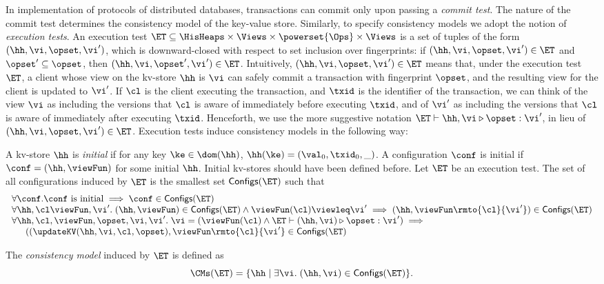 In implementation of protocols of distributed databases, transactions can 
commit only upon passing a \emph{commit test}. 
The nature of the commit test determines the consistency model of 
the key-value store.
Similarly, to specify consistency models we adopt the notion of 
\emph{execution tests}. An execution test 
$\ET \subseteq \HisHeaps \times \Views \times \powerset{\Ops} \times \Views$ 
is a set of tuples of the form $(\hh, \vi, \opset, \vi')$, 
which is downward-closed with respect to set inclusion over fingerprints: 
if $(\hh, \vi, \opset, \vi') \in \ET$ and $\opset' \subseteq \opset$, then 
$(\hh, \vi, \opset', \vi') \in \ET$.
Intuitively, 
$(\hh, \vi, \opset, \vi') \in \ET$ means that, under the execution test 
$\ET$, a client whose view on the kv-store $\hh$ is $\vi$ can safely 
commit a transaction with fingerprint $\opset$, and the resulting 
view for the client is updated to $\vi'$. If $\cl$ is the client executing 
the transaction, and $\txid$ is the identifier of the transaction, we can think of the view 
$\vi$ as including the versions that $\cl$ is aware of immediately before 
executing $\txid$, and of $\vi'$ as including the versions that $\cl$ is 
aware of immediately after executing $\txid$.
Henceforth, we use the more 
suggestive notation $\ET \vdash \hh, \vi \triangleright \opset : \vi'$, 
in lieu of $(\hh, \vi, \opset, \vi') \in \ET$.
Execution tests induce consistency models in the following way: 
\begin{definition}
\label{def:cm}
A kv-store $\hh$ is \emph{initial} if for any key $\ke \in \dom(\hh)$, 
$\hh(\ke) = (\val_0, \txid_0, \_)$. A configuration $\conf$ is 
initial  if $\conf = (\hh, \viewFun)$ for some initial $\hh$.
\ac{Initial kv-stores should have been defined before.}
Let $\ET$ be an execution test. The set of all configurations 
induced by $\ET$ is the smallest set $\mathsf{Configs}(\ET)$ 
such that 
\[
\begin{array}{l}
\forall \conf. \conf \text{ is initial} \implies \conf \in \mathsf{Configs}(\ET)\\
\forall \hh, \cl \viewFun,\vi'.\; (\hh, \viewFun) \in \mathsf{Configs}(\ET) \wedge \viewFun(\cl) \viewleq \vi' \implies (\hh, \viewFun\rmto{\cl}{\vi'}) \in \mathsf{Configs}(\ET)\\
\forall \hh, \cl, \viewFun, \opset, \vi, \vi'.\; \vi = (\viewFun(\cl) \wedge \ET \vdash (\hh, \vi) \triangleright \opset : \vi') \implies {}\\
\hspace{15pt}
((\updateKV(\hh, \vi, \cl, \opset), \viewFun\rmto{\cl}{\vi'} \in \mathsf{Configs}(\ET) 
\end{array}
\]

The \emph{consistency model} induced by $\ET$ is defined as 
\[
\CMs(\ET) = \{ \hh \mid \exists \vi.\; (\hh, \vi) \in \mathsf{Configs}(\ET) \}.
\]
\end{definition}

